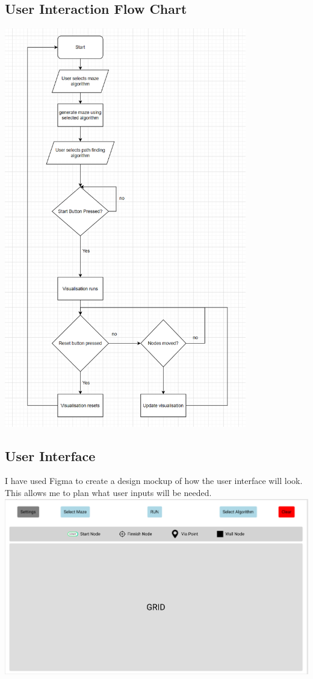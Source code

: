 \documentclass{article}
\begin{document}
\subsection{User Interaction Flow Chart}
\includegraphics[width=\linewidth, height=17.5cm]{assets/flow chart.PNG}

\subsection{User Interface}
I have used Figma to create a design mockup of how the user interface will look. This allows me to plan what user inputs will be needed.
\newline
\includegraphics[width=\linewidth]{assets/gui.PNG}
\end{document}
